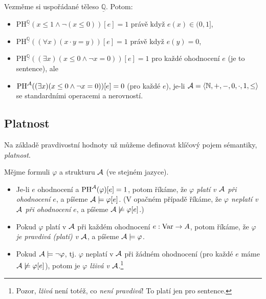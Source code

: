 \begin{example}
Vezměme si uspořádané těleso $\underline{\mathbb Q}$. Potom:
\begin{itemize}
    \item $\mathrm{PH}^{\underline{\mathbb Q}}(x\leq 1 \land \neg (x\leq 0))[e]=1$ právě když $e(x)\in (0,1]$,
    \item $\mathrm{PH}^{\underline{\mathbb Q}}((\forall x)(x\cdot y = y))[e]=1$ právě když $e(y)=0$,
    \item $\mathrm{PH}^{\underline{\mathbb Q}}((\exists x)(x \leq 0 \land \neg x=0))[e]=1$ pro každé ohodnocení $e$ (je to sentence), ale 
    \item $\mathrm{PH}^{\mathcal{A}}((\exists x)(x \leq 0 \land \neg x=0))[e]=0$ (pro každé $e$), je-li $\mathcal{A}=\langle \mathbb N,+,-,0,\cdot,1,\leq\rangle$ se standardními operacemi a nerovností.
\end{itemize}    
\end{example}


\subsection{Platnost}

Na základě pravdivostní hodnoty už můžeme definovat klíčový pojem sémantiky, \emph{platnost}.

\begin{definition}
Mějme formuli $\varphi$ a strukturu $\mathcal{A}$ (ve stejném jazyce). 
\begin{itemize}
    \item Je-li $e$ ohodnocení a $\mathrm{PH}^{\mathcal{A}}(\varphi)[e]=1$, potom říkáme, že \emph{$\varphi$ platí v $\mathcal{A}$ při ohodnocení $e$}, a píšeme $\mathcal{A}\models\varphi[e]$. (V opačném případě říkáme, že \emph{$\varphi$ neplatí v $\mathcal{A}$ při ohodnocení $e$}, a píšeme $\mathcal{A}\not\models\varphi[e]$.)
    \item Pokud $\varphi$ platí v $\mathcal{A}$ při každém ohodnocení $e:\operatorname{Var}\to A$, potom říkáme, že \emph{$\varphi$ je pravdivá (platí) v $\mathcal{A}$}, a píšeme $\mathcal{A}\models\varphi$.
    \item Pokud $\mathcal{A}\models\neg\varphi$, tj. $\varphi$ neplatí v $\mathcal{A}$ při žádném ohodnocení (pro každé $e$ máme $\mathcal{A}\not\models\varphi[e]$), potom je \emph{$\varphi$ lživá v $\mathcal{A}$}.\footnote{Pozor, \emph{lživá} není totéž, co \emph{není pravdivá}! To platí jen pro sentence.}
\end{itemize}    
\end{definition}

